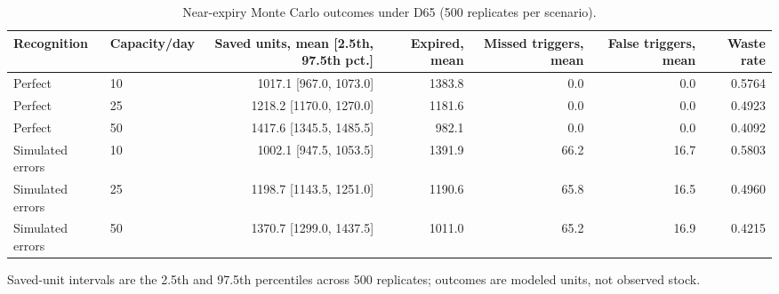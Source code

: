 \begin{table}[!t]
\caption{Near-expiry Monte Carlo outcomes under D65 (500 replicates per scenario).}
\label{tab:donation}\centering\scriptsize
\begin{tabular}{llrrrrr}
\toprule
Recognition & Capacity/day & Saved units, mean [2.5th, 97.5th pct.] & Expired, mean & Missed triggers, mean & False triggers, mean & Waste rate \\
\midrule
Perfect & 10 & 1017.1 [967.0, 1073.0] & 1383.8 & 0.0 & 0.0 & 0.5764 \\
Perfect & 25 & 1218.2 [1170.0, 1270.0] & 1181.6 & 0.0 & 0.0 & 0.4923 \\
Perfect & 50 & 1417.6 [1345.5, 1485.5] & 982.1 & 0.0 & 0.0 & 0.4092 \\
Simulated errors & 10 & 1002.1 [947.5, 1053.5] & 1391.9 & 66.2 & 16.7 & 0.5803 \\
Simulated errors & 25 & 1198.7 [1143.5, 1251.0] & 1190.6 & 65.8 & 16.5 & 0.4960 \\
Simulated errors & 50 & 1370.7 [1299.0, 1437.5] & 1011.0 & 65.2 & 16.9 & 0.4215 \\
\bottomrule
\end{tabular}
\par\vspace{3pt}\footnotesize Saved-unit intervals are the 2.5th and 97.5th percentiles across 500 replicates; outcomes are modeled units, not observed stock.
\end{table}
